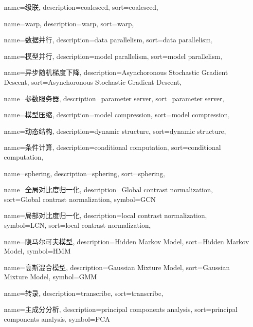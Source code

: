 {
  name=级联,
  description={coalesced},
  sort={coalesced},
}

{
  name=warp,
  description={warp},
  sort={warp},
}

{
  name=数据并行,
  description={data parallelism},
  sort={data parallelism},
}

{
  name=模型并行,
  description={model parallelism},
  sort={model parallelism},
}

{
  name=异步随机梯度下降,
  description={Asynchoronous Stochastic Gradient Descent},
  sort={Asynchoronous Stochastic Gradient Descent},
}

{
  name=参数服务器,
  description={parameter server},
  sort={parameter server},
}

{
  name=模型压缩,
  description={model compression},
  sort={model compression},
}

{
  name=动态结构,
  description={dynamic structure},
  sort={dynamic structure},
}

{
  name=条件计算,
  description={conditional computation},
  sort={conditional computation},
}

{
  name=sphering,
  description={sphering},
  sort={sphering},
}

{
  name=全局对比度归一化,
  description={Global contrast normalization},
  sort={Global contrast normalization},
  symbol={GCN}
}

{
  name=局部对比度归一化,
  description={local contrast normalization},
  symbol={LCN},
  sort={local contrast normalization},
}

{
  name=隐马尔可夫模型,
  description={Hidden Markov Model},
  sort={Hidden Markov Model},
  symbol={HMM}
}

{
  name=高斯混合模型,
  description={Gaussian Mixture Model},
  sort={Gaussian Mixture Model},
  symbol={GMM}
}

{
  name=转录,
  description={transcribe},
  sort={transcribe},
}

{
  name=主成分分析,
  description={principal components analysis},
  sort={principal components analysis},
  symbol={PCA}
}

